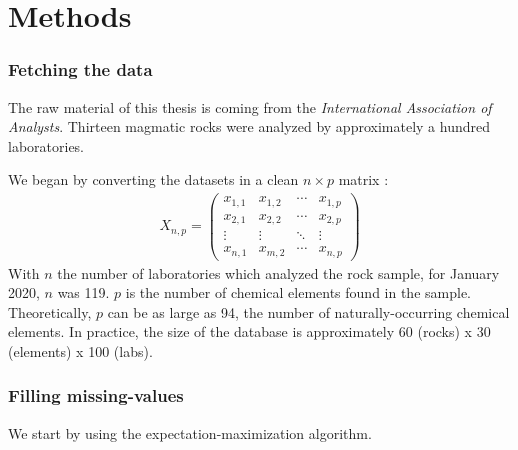 \chapter{Methods}
\subsection{Fetching the data}
The raw material of this thesis is coming from the \textit{International Association of Analysts}. Thirteen magmatic rocks were analyzed by approximately a hundred laboratories. 

We began by converting the datasets in a clean $n\times p$ matrix :
\begin{align} \label{matrix}
X_{n,p} = 
\begin{pmatrix}
x_{1,1} & x_{1,2} & \cdots & x_{1,p} \\
x_{2,1} & x_{2,2} & \cdots & x_{2,p} \\
\vdots  & \vdots  & \ddots & \vdots  \\
x_{n,1} & x_{m,2} & \cdots & x_{n,p} 
\end{pmatrix}
\end{align}
With $n$ the number of laboratories which analyzed the rock sample, for January 2020, $n$ was 119. $p$ is the number of chemical elements found in the sample. Theoretically, $p$ can be as large as 94, the number of naturally-occurring chemical elements. In practice, the size of the database is approximately 60 (rocks) x 30 (elements) x 100 (labs). 
\subsection{Filling missing-values}
We start by using the expectation-maximization algorithm. 